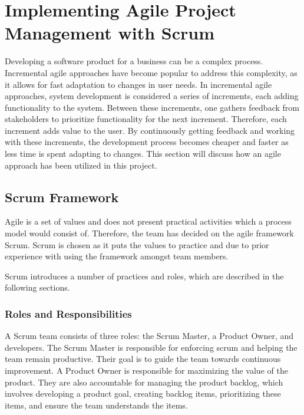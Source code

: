 \section{Implementing Agile Project Management with Scrum}
Developing a software product for a business can be a complex process.
Incremental agile approaches have become popular to address this complexity, as it allows for fast adaptation to changes in user needs. \cite{sommervilleSoftwareEngineering2016}
In incremental agile approaches, system development is considered a series of increments, each adding functionality to the system.
Between these increments, one gathers feedback from stakeholders to prioritize functionality for the next increment.
Therefore, each increment adds value to the user.
By continuously getting feedback and working with these increments, the development process becomes cheaper and faster as less time is spent adapting to changes.\cite{sommervilleSoftwareEngineering2016}
This section will discuss how an agile approach has been utilized in this project. 

\subsection{Scrum Framework}
Agile is a set of values and does not present practical activities which a process model would consist of\cite{sutherlandScrumArtDoing2014}.
Therefore, the team has decided on the agile framework Scrum\cite{scrumdotorg}. Scrum is chosen as it puts the values to practice and due to prior experience with using the framework amongst team members. 

Scrum introduces a number of practices and roles, which are described in the following sections. 

\subsubsection*{Roles and Responsibilities}
A Scrum team consists of three roles: the Scrum Master, a Product Owner, and developers.
The Scrum Master is responsible for enforcing scrum and helping the team remain productive.
Their goal is to guide the team towards continuous improvement.
A Product Owner is responsible for maximizing the value of the product.
They are also accountable for managing the product backlog, which involves developing a product goal, creating backlog items, prioritizing these items, and ensure the team understands the items. \cite{scrumdotorg}

